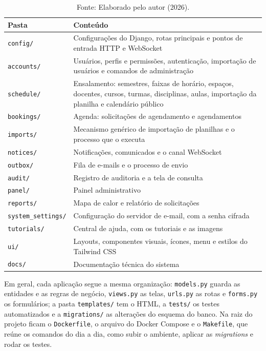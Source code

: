 \begin{table}[!htb]
	\centering
	\caption{Estrutura de pastas do projeto}
	\small
	\begin{tabular}{@{}>{\raggedright\arraybackslash}p{3.4cm}>{\raggedright\arraybackslash}p{11.2cm}@{}}
	\hline
		\textbf{Pasta} & \textbf{Conteúdo} \\ \hline
		\texttt{config/} & Configurações do Django, rotas principais e pontos de entrada HTTP e WebSocket \\
		\texttt{accounts/} & Usuários, perfis e permissões, autenticação, importação de usuários e comandos de administração \\
		\texttt{schedule/} & Ensalamento: semestres, faixas de horário, espaços, docentes, cursos, turmas, disciplinas, aulas, importação da planilha e calendário público \\
		\texttt{bookings/} & Agenda: solicitações de agendamento e agendamentos \\
		\texttt{imports/} & Mecanismo genérico de importação de planilhas e o processo que o executa \\
		\texttt{notices/} & Notificações, comunicados e o canal WebSocket \\
		\texttt{outbox/} & Fila de e-mails e o processo de envio \\
		\texttt{audit/} & Registro de auditoria e a tela de consulta \\
		\texttt{panel/} & Painel administrativo \\
		\texttt{reports/} & Mapa de calor e relatório de solicitações \\
		\texttt{system\_settings/} & Configuração do servidor de e-mail, com a senha cifrada \\
		\texttt{tutorials/} & Central de ajuda, com os tutoriais e as imagens \\
		\texttt{ui/} & Layouts, componentes visuais, ícones, menu e estilos do Tailwind CSS \\
		\texttt{docs/} & Documentação técnica do sistema \\ \hline
	\end{tabular}
	\caption*{Fonte: Elaborado pelo autor (2026).}
	\label{tab:estrutura}
\end{table}

Em geral, cada aplicação segue a mesma organização: \texttt{models.py} guarda as entidades e as regras de negócio, \texttt{views.py} as telas, \texttt{urls.py} as rotas e \texttt{forms.py} os formulários; a pasta \texttt{templates/} tem o HTML, a \texttt{tests/} os testes automatizados e a \texttt{migrations/} as alterações do esquema do banco. Na raiz do projeto ficam o \texttt{Dockerfile}, o arquivo do Docker Compose e o \texttt{Makefile}, que reúne os comandos do dia a dia, como subir o ambiente, aplicar as \textit{migrations} e rodar os testes.

